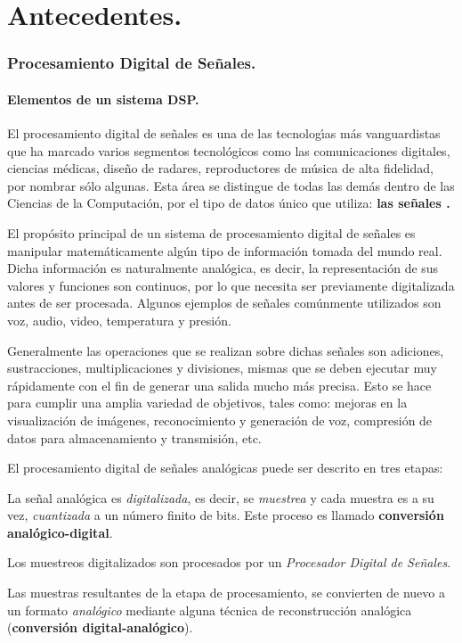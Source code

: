 
\part{Antecedentes.}

\section{Procesamiento Digital de Se\~{n}ales.}

\subsection{Elementos de un sistema DSP.}

El procesamiento digital de se\~{n}ales es una de las tecnolog\'{\i}as
m\'{a}s vanguardistas que ha marcado varios segmentos tecnol\'{o}gicos
como las comunicaciones digitales, ciencias m\'{e}dicas, dise\~{n}o
de radares, reproductores de m\'{u}sica de alta fidelidad, por nombrar
s\'{o}lo algunas. Esta \'{a}rea se distingue de todas las dem\'{a}s
dentro de las Ciencias de la Computaci\'{o}n, por el tipo de datos
\'{u}nico que utiliza: \textbf{las se\~{n}ales \cite{New1}. }

El prop\'{o}sito principal de un sistema de procesamiento digital
de se\~{n}ales es manipular matem\'{a}ticamente alg\'{u}n tipo de
informaci\'{o}n tomada del mundo real. Dicha informaci\'{o}n es naturalmente
anal\'{o}gica, es decir, la representaci\'{o}n de sus valores y funciones
son continuos, por lo que necesita ser previamente digitalizada antes
de ser procesada. Algunos ejemplos de se\~{n}ales com\'{u}nmente utilizados
son voz, audio, video, temperatura y presi\'{o}n. 

Generalmente las operaciones que se realizan sobre dichas se\~{n}ales
son adiciones, sustracciones, multiplicaciones y divisiones, mismas
que se deben ejecutar muy r\'{a}pidamente con el fin de generar una
salida mucho m\'{a}s precisa\cite{analog_devices}. Esto se hace para
cumplir una amplia variedad de objetivos, tales como: mejoras en la
visualizaci\'{o}n de im\'{a}genes, reconocimiento y generaci\'{o}n
de voz, compresi\'{o}n de datos para almacenamiento y transmisi\'{o}n,
etc. 

El procesamiento digital de se\~{n}ales anal\'{o}gicas puede ser descrito
en tres etapas:
\begin{itemize}
\begin{doublespace}
\item La se\~{n}al anal\'{o}gica es \emph{digitalizada}, es decir, se \emph{muestrea}
y cada muestra es a su vez, \emph{cuantizada} a un n\'{u}mero finito
de bits. Este proceso es llamado \textbf{conversi\'{o}n anal\'{o}gico-digital}.
\item Los muestreos digitalizados son procesados por un \emph{Procesador
Digital de Se\~{n}ales}.
\item Las muestras resultantes de la etapa de procesamiento, se convierten
de nuevo a un formato \emph{anal\'{o}gico} mediante alguna t\'{e}cnica
de reconstrucci\'{o}n anal\'{o}gica (\textbf{conversi\'{o}n digital-anal\'{o}gico}).
\end{doublespace}
\end{itemize}

